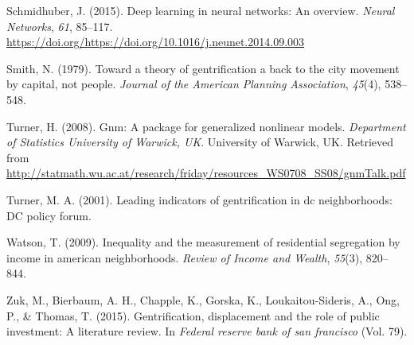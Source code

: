 \documentclass[conference,final,]{IEEEtran}
\begin{document}
\leavevmode\hypertarget{ref-SCHMIDHUBER201585}{}%
Schmidhuber, J. (2015). Deep learning in neural networks: An overview.
\emph{Neural Networks}, \emph{61}, 85--117.
\url{https://doi.org/https://doi.org/10.1016/j.neunet.2014.09.003}

\leavevmode\hypertarget{ref-Smith1979}{}%
Smith, N. (1979). Toward a theory of gentrification a back to the city
movement by capital, not people. \emph{Journal of the American Planning
Association}, \emph{45}(4), 538--548.

\leavevmode\hypertarget{ref-turner_2008}{}%
Turner, H. (2008). Gnm: A package for generalized nonlinear models.
\emph{Department of Statistics University of Warwick, UK}. University of
Warwick, UK. Retrieved from
\url{http://statmath.wu.ac.at/research/friday/resources_WS0708_SS08/gnmTalk.pdf}

\leavevmode\hypertarget{ref-Turner2001}{}%
Turner, M. A. (2001). Leading indicators of gentrification in dc
neighborhoods: DC policy forum.

\leavevmode\hypertarget{ref-Watson2009}{}%
Watson, T. (2009). Inequality and the measurement of residential
segregation by income in american neighborhoods. \emph{Review of Income
and Wealth}, \emph{55}(3), 820--844.

\leavevmode\hypertarget{ref-Zuk2015}{}%
Zuk, M., Bierbaum, A. H., Chapple, K., Gorska, K., Loukaitou-Sideris,
A., Ong, P., \& Thomas, T. (2015). Gentrification, displacement and the
role of public investment: A literature review. In \emph{Federal reserve
bank of san francisco} (Vol. 79).
\end{document}

